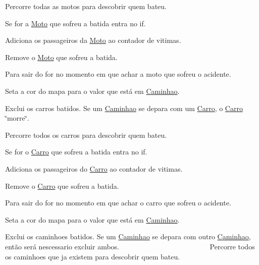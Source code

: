 Percorre todas as motos para descobrir quem bateu.

Se for a \mbox{\hyperlink{class_moto}{Moto}} que sofreu a batida entra no if.

Adiciona os passageiros da \mbox{\hyperlink{class_moto}{Moto}} ao contador de vitimas.

Remove o \mbox{\hyperlink{class_moto}{Moto}} que sofreu a batida.

Para sair do for no momento em que achar a moto que sofreu o acidente.

Seta a cor do mapa para o valor que está em \mbox{\hyperlink{class_caminhao}{Caminhao}}.

Exclui os carros batidos. Se um \mbox{\hyperlink{class_caminhao}{Caminhao}} se depara com um \mbox{\hyperlink{class_carro}{Carro}}, o \mbox{\hyperlink{class_carro}{Carro}} \char`\"{}morre\char`\"{}.

Percorre todos os carros para descobrir quem bateu.

Se for o \mbox{\hyperlink{class_carro}{Carro}} que sofreu a batida entra no if.

Adiciona os passageiros do \mbox{\hyperlink{class_carro}{Carro}} ao contador de vitimas.

Remove o \mbox{\hyperlink{class_carro}{Carro}} que sofreu a batida.

Para sair do for no momento em que achar o carro que sofreu o acidente.

Seta a cor do mapa para o valor que está em \mbox{\hyperlink{class_caminhao}{Caminhao}}.

Exclui os caminhoes batidos. Se um \mbox{\hyperlink{class_caminhao}{Caminhao}} se depara com outro \mbox{\hyperlink{class_caminhao}{Caminhao}}, então será nescessario excluir ambos. ~\newline
~\newline
~\newline
~\newline
~\newline
~\newline
~\newline
~\newline
~\newline
~\newline
~\newline
~\newline
~\newline
~\newline
~\newline
 Percorre todos os caminhoes que ja existem para descobrir quem bateu.

